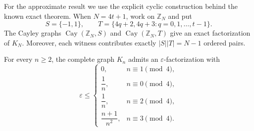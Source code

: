 \documentclass{file}
\newcommand{\eps}{\varepsilon}
\newcommand{\Cay}{\operatorname{Cay}}
\begin{document}
For the approximate result we use the explicit cyclic construction behind the
known exact theorem.  When $N=4t+1$, work on $\mathbb Z_N$ and put
\[
  S=\{-1,1\},
  \qquad
  T=\{4q+2,4q+3:q=0,1,\dots,t-1\}.
\]
The Cayley graphs $\Cay(\mathbb Z_N,S)$ and $\Cay(\mathbb Z_N,T)$ give an exact factorization of $K_N$.  
Moreover, each witness contributes exactly $|S||T|=N-1$ ordered pairs.


\begin{thm}
\label{cor:complete-improved-eps}
For every $n\ge 2$, the complete graph $K_n$ admits an
$\eps$-factorization with
\[
\eps \le
\begin{cases}
0, & n\equiv 1 \pmod 4,\\[2mm]
\dfrac{1}{n}, & n\equiv 0 \pmod 4,\\[3mm]
\dfrac{1}{n}, & n\equiv 2 \pmod 4,\\[3mm]
\dfrac{n+1}{n^2}, & n\equiv 3 \pmod 4.
\end{cases}
\]
\end{thm}
\end{document}
